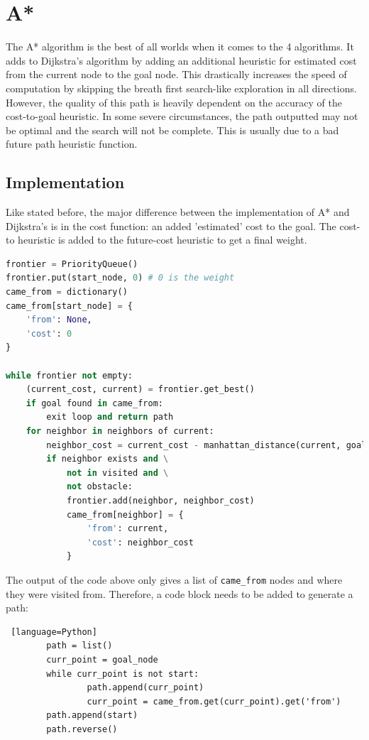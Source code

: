 \documentclass[journal]{IEEEtran}
\begin{document}
    \section{A*} \label{A*}
    The A* algorithm is the best of all worlds when it comes to the 4 algorithms. It adds to Dijkstra's algorithm by adding an additional heuristic for estimated cost from the current node to the goal node. This drastically increases the speed of computation by skipping the breath first search-like exploration in all directions. However, the quality of this path is heavily dependent on the accuracy of the cost-to-goal heuristic. In some severe circumstances, the path outputted may not be optimal and the search will not be complete. This is usually due to a bad future path heuristic function.

    \subsection{Implementation}
    Like stated before, the major difference between the implementation of A* and Dijkstra's is in the cost function: an added 'estimated' cost to the goal. The cost-to heuristic is added to the future-cost heuristic to get a final weight. 

    \begin{lstlisting}[language=Python]
frontier = PriorityQueue()
frontier.put(start_node, 0) # 0 is the weight
came_from = dictionary()
came_from[start_node] = {
    'from': None,
    'cost': 0
}

while frontier not empty:
    (current_cost, current) = frontier.get_best()
    if goal found in came_from:
        exit loop and return path
    for neighbor in neighbors of current:
        neighbor_cost = current_cost - manhattan_distance(current, goal) + manhattan_distance(current, neighbor) + manhattan_distance(current, neighbor)
        if neighbor exists and \
            not in visited and \
            not obstacle:
            frontier.add(neighbor, neighbor_cost)
            came_from[neighbor] = {
                'from': current,
                'cost': neighbor_cost
            }
    \end{lstlisting}
        
    The output of the code above only gives a list of \lstinline{came_from} nodes and where they were visited from. Therefore, a code block needs to be added to generate a path:

    \begin{lstlisting} [language=Python]
        path = list()
        curr_point = goal_node
        while curr_point is not start:
                path.append(curr_point)
                curr_point = came_from.get(curr_point).get('from')
        path.append(start)
        path.reverse()
            \end{lstlisting}
\end{document}
